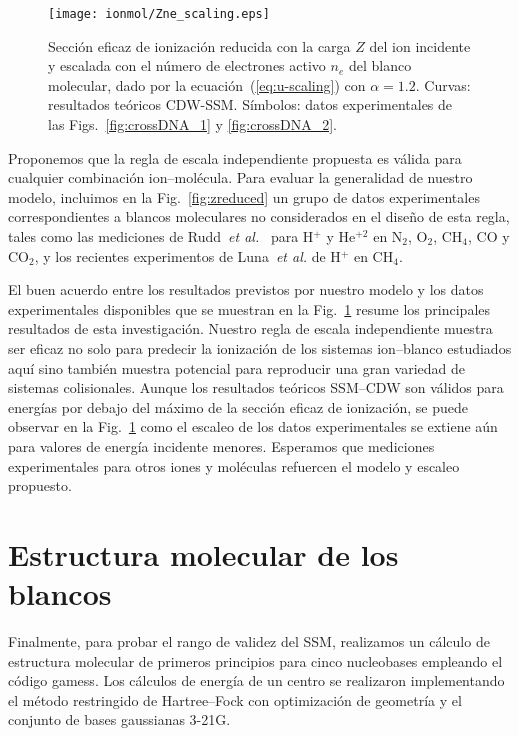 \begin{figure}[t]
\centering
\texttt{[image: ionmol/Zne\_scaling.eps]}
\caption[Sección eficaz de ionización reducida por $Z$ y $n_e$.]
{Sección eficaz de ionización reducida con la carga $Z$ del ion incidente
y escalada con el número de electrones activo $n_e$ del blanco molecular,
dado por la ecuación~(\ref{eq:u-scaling}) con $\alpha=1.2$. 
Curvas: resultados teóricos CDW-SSM. Símbolos: datos experimentales de 
las Figs.~\ref{fig:crossDNA_1} y \ref{fig:crossDNA_2}.}
\label{fig:zalpha}
\end{figure} 

Proponemos que la regla de escala independiente propuesta es válida para 
cualquier combinación ion--molécula. Para evaluar la generalidad de 
nuestro modelo, incluimos en la Fig.~\ref{fig:zreduced} un grupo de datos 
experimentales correspondientes a blancos moleculares no considerados en 
el diseño de esta regla, tales como las mediciones de 
Rudd~\textit{et al.}~\cite{Rudd:85,Rudd:83} para H$^{+}$ y He$^{+2}$ 
en N$_2$, O$_2$, CH$_4$, CO y CO$_2$, y los recientes experimentos de
Luna~\textit{et al.} \cite{Luna2019} de H$^{+}$ en CH$_4$. 

El buen acuerdo entre los resultados previstos por nuestro modelo y los
datos experimentales disponibles que se muestran en la 
Fig.~\ref{fig:zalpha} resume los principales resultados de esta 
investigación. Nuestro regla de escala independiente muestra ser eficaz 
no solo para predecir la ionización de los sistemas ion--blanco 
estudiados aquí sino también muestra potencial para reproducir una gran 
variedad de sistemas colisionales. Aunque los resultados teóricos 
SSM--CDW son válidos para energías por debajo del máximo de la sección 
eficaz de ionización, se puede observar en la Fig.~\ref{fig:zalpha} como 
el escaleo de los datos experimentales se extiene aún para valores de 
energía incidente menores. Esperamos que mediciones experimentales para 
otros iones y moléculas refuercen el modelo y escaleo propuesto.

\section{Estructura molecular de los blancos}
\label{sec:molcalculations}

Finalmente, para probar el rango de validez del SSM, realizamos un 
cálculo de estructura molecular de primeros principios para cinco 
nucleobases empleando el código {\sc gamess}. Los cálculos de energía de 
un centro se realizaron implementando el método restringido de 
Hartree--Fock con optimización de geometría y el conjunto de bases 
gaussianas 3-21G. 

